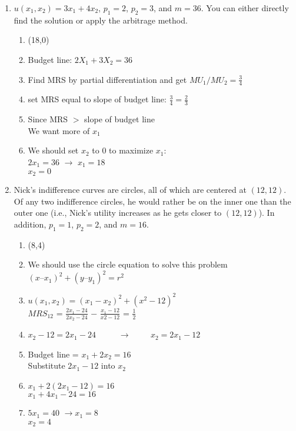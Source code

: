 \documentclass[11pt]{article}
\begin{document}
\begin{enumerate}
\begin{enumerate}
        \item $u(x_{1},x_{2})=3x_{1}+4x_{2}$, $p_{1}=2$, $p_{2}=3$, and $m=36$. You can either directly find the solution or apply the arbitrage method.
        \begin{enumerate}
            \item (18,0)
            \item Budget line: $2X_{1}+3X_{2}=36$
            \item Find MRS by partial differentiation and get $MU_{1}/MU_{2} = \frac{3}{4}$
            \item set MRS equal to slope of budget line: $\frac{3}{4} = \frac{2}{3}$
            \item Since MRS $>$ slope of budget line
            \\We want more of $x_{1}$
            \item We should set $x_{2}$ to 0 to maximize $x_{1}$:\\ $2x_{1}=36$ $\rightarrow$ $x_{1}=18$ \\
            $x_{2}=0$
        \end{enumerate}


        \item Nick's indifference curves are circles, all of which are centered at $(12,12)$. Of any two indifference circles, he would rather be on the inner one than the outer one (i.e., Nick's utility increases as he gets closer to $(12,12)$). In addition, $p_{1}=1$, $p_{2}=2$, and $m=16$.
        \begin{enumerate}
            \item (8,4)
            \item We should use the circle equation to solve this problem\\
            $(x – x_{1})^2 + (y – y_{1})^2= r^2$
            \item $u(x_{1},x_{2})= (x_{1}-x_{2})^2+(x^2-12)^2$
            \\$MRS_{12}$ = $\frac{2x_1 - 24}{2x_2 - 24}$ − $\frac{x_1 - 12}{x2 - 12}$ = $\frac{1}{2}$
            \item $x_2-12 =2x_1-24$ $\hspace{1cm}\rightarrow \hspace{1cm} x_2 = 2x_1-12$
            \item Budget line = $x_1+2x_2=16$\\
            Substitute $2x_1-12$ into $x_2$
            \item $x_1+2(2x_1-12)=16$ \\
            $x_1+4x_1-24=16$
            \item $5x_1 =40$ $\rightarrow x_1 = 8$\\
            $x_2 =4$
        \end{enumerate}


\end{enumerate}
\end{enumerate}
\end{document}

